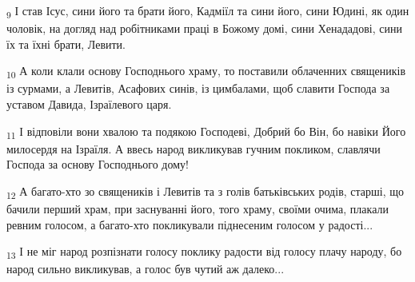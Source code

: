\begin{tcolorbox}
\textsubscript{9} І став Ісус, сини його та брати його, Кадміїл та сини його, сини Юдині, як один чоловік, на догляд над робітниками праці в Божому домі, сини Хенададові, сини їх та їхні брати, Левити.
\end{tcolorbox}
\begin{tcolorbox}
\textsubscript{10} А коли клали основу Господнього храму, то поставили облаченних священиків із сурмами, а Левитів, Асафових синів, із цимбалами, щоб славити Господа за уставом Давида, Ізраїлевого царя.
\end{tcolorbox}
\begin{tcolorbox}
\textsubscript{11} І відповіли вони хвалою та подякою Господеві, Добрий бо Він, бо навіки Його милосердя на Ізраїля. А ввесь народ викликував гучним покликом, славлячи Господа за основу Господнього дому!
\end{tcolorbox}
\begin{tcolorbox}
\textsubscript{12} А багато-хто зо священиків і Левитів та з голів батьківських родів, старші, що бачили перший храм, при заснуванні його, того храму, своїми очима, плакали ревним голосом, а багато-хто покликували піднесеним голосом у радості...
\end{tcolorbox}
\begin{tcolorbox}
\textsubscript{13} І не міг народ розпізнати голосу поклику радости від голосу плачу народу, бо народ сильно викликував, а голос був чутий аж далеко...
\end{tcolorbox}
